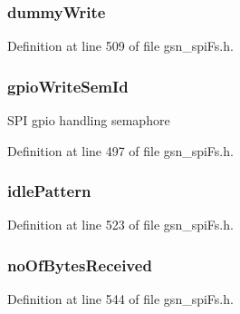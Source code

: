 \hypertarget{a00232_abdf3222930534e618e383d4015985ecf}{
\subsubsection[{dummyWrite}]{ {\bf dummyWrite}}}
\label{a00232_abdf3222930534e618e383d4015985ecf}


Definition at line 509 of file gsn\_\-spiFs.h.

\hypertarget{a00232_ac0d7eb72a3873cada0b3fa697b2782b9}{
\subsubsection[{gpioWriteSemId}]{ {\bf gpioWriteSemId}}}
\label{a00232_ac0d7eb72a3873cada0b3fa697b2782b9}
SPI gpio handling semaphore 

Definition at line 497 of file gsn\_\-spiFs.h.

\hypertarget{a00232_a66c4a026b5acb2b1b2974040b6936298}{
\subsubsection[{idlePattern}]{ {\bf idlePattern}}}
\label{a00232_a66c4a026b5acb2b1b2974040b6936298}


Definition at line 523 of file gsn\_\-spiFs.h.

\hypertarget{a00232_a99212c0c53a159d243003e1846ca8f37}{
\subsubsection[{noOfBytesReceived}]{ {\bf noOfBytesReceived}}}
\label{a00232_a99212c0c53a159d243003e1846ca8f37}


Definition at line 544 of file gsn\_\-spiFs.h.

